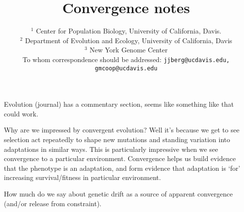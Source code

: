 \documentclass[a4paper,10pt]{article}
\begin{document}
\title{Convergence notes}

\author{
$^1$ Center for Population Biology, University of California, Davis.\\
$^2$ Department of Evolution and Ecology, University of California, Davis\\
$^3$ New York Genome Center\\
\small To whom correspondence should be addressed: \texttt{jjberg@ucdavis.edu, gmcoop@ucdavis.edu}\\
}

\maketitle

Evolution (journal) has a commentary section, seems like something like that could work.




Why are we impressed by convergent evolution? Well it's because we get
to see selection act repeatedly to shape new mutations and standing
variation into adaptations in similar ways. This is particularly
impressive when we see convergence to a particular environment. Convergence helps us build
evidence that the phenotype is an adaptation, and form evidence that
adaptation is `for' increasing survival/fitness in particular
environment. 

How much do we say about genetic drift as a source of apparent convergence (and/or release from constraint).
\end{document}

